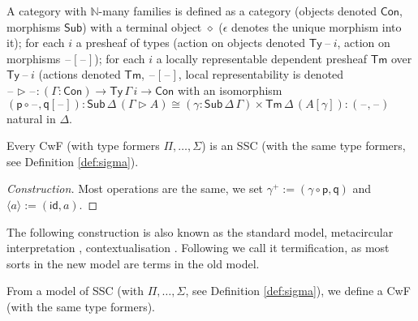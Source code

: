 \documentclass[sigplan,10pt,anonymous,review]{acmart}\settopmatter{printfolios=true,printccs=false,printacmref=false}
\newcommand{\ra}{\rightarrow}
\newcommand{\Ty}{\mathsf{Ty}}
\newcommand{\Tm}{\mathsf{Tm}}
\newcommand{\Con}{\mathsf{Con}}
\newcommand{\Sub}{\mathsf{Sub}}
\newcommand{\p}{\mathsf{p}}
\newcommand{\q}{\mathsf{q}}
\newcommand{\ext}{\mathop{\triangleright}}
\newcommand{\N}{\mathbb{N}}
\newcommand{\blank}{\mathord{\hspace{1pt}\text{--}\hspace{1pt}}} %
\newcommand{\id}{\mathsf{id}}
\begin{document}
\begin{definition}[CwF]
  A category with $\N$-many families is defined as a category (objects
  denoted $\Con$, morphisms $\Sub$) with a terminal object $\diamond$
  ($\epsilon$ denotes the unique morphism into it); for each $i$ a
  presheaf of types (action on objects denoted $\Ty\,\blank\,i$,
  action on morphisms $\blank[\blank]$); for each $i$ a locally
  representable dependent presheaf $\Tm$ over $\Ty\,\blank\,i$
  (actions denoted $\Tm$, $\blank[\blank]$, local representability is
  denoted $\blank\ext\blank : (\Gamma:\Con)\ra\Ty\,\Gamma\,i\ra\Con$
  with an isomorphism
  $
  (\p\circ\blank,\q[\blank]) : \Sub\,\Delta\,(\Gamma\ext A) \cong (\gamma:\Sub\,\Delta\,\Gamma)\times\Tm\,\Delta\,(A[\gamma]) : (\blank,\blank)
  $
  natural in $\Delta$.
\end{definition}
\begin{problem}
  Every CwF (with type formers $\Pi, \dots, \Sigma$) is an SSC (with
  the same type formers, see Definition \ref{def:sigma}).
\end{problem}
\begin{proof}[Construction]
  Most operations are the same, we set $\gamma^+ :=
  (\gamma\circ\p,\q)$ and $\langle a\rangle := (\id,a)$.
\end{proof}
The following construction is also known as the standard model,
metacircular interpretation \cite{DBLP:conf/popl/AltenkirchK16},
contextualisation \cite{DBLP:conf/fscd/BocquetKS23}. Following
\cite{kaposi-shallow} we call it termification, as most sorts in the
new model are terms in the old model.
\begin{problem}[Termification]
  From a model of SSC (with $\Pi, \dots, \Sigma$, see Definition
  \ref{def:sigma}), we define a CwF (with the same type formers).
\end{problem}
\end{document}
